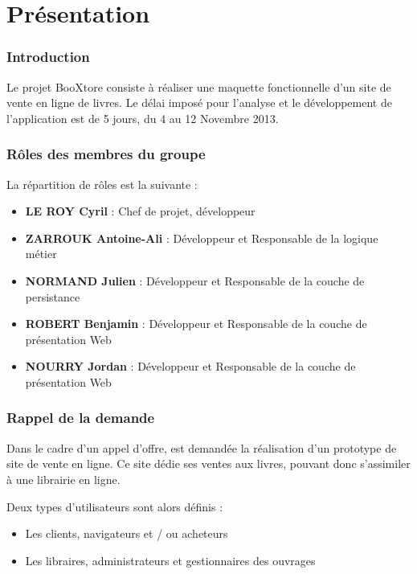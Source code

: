 \part{Présentation}
\section{Introduction}

	Le projet BooXtore consiste à réaliser une maquette fonctionnelle d'un site de vente en ligne de livres. Le délai imposé pour l'analyse et le développement de l'application est de 5 jours, du 4 au 12 Novembre 2013.

\section{Rôles des membres du groupe}

	La répartition de rôles est la suivante :
	\begin{itemize}
		\item \textbf{LE ROY Cyril} : Chef de projet, développeur
		\item \textbf{ZARROUK Antoine-Ali} : Développeur et Responsable de la logique métier
		\item \textbf{NORMAND Julien} : Développeur et Responsable de la couche de persistance
		\item \textbf{ROBERT Benjamin} : Développeur et Responsable de la couche de présentation Web
		\item \textbf{NOURRY Jordan} : Développeur et Responsable de la couche de présentation Web
	\end{itemize}

\section{Rappel de la demande}

	Dans le cadre d'un appel d'offre, est demandée la réalisation d'un prototype de site de vente en ligne. Ce site dédie ses ventes aux livres, pouvant donc s'assimiler à une librairie en ligne.

	Deux types d'utilisateurs sont alors définis :
	\begin{itemize}
		\item Les clients, navigateurs et / ou acheteurs
		\item Les libraires, administrateurs et gestionnaires des ouvrages
	\end{itemize}
